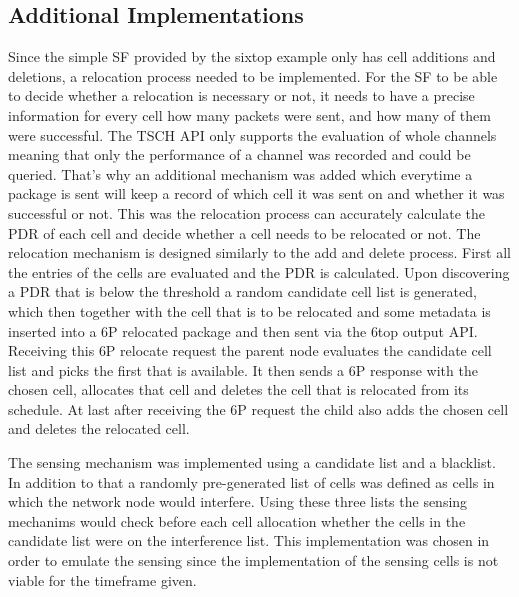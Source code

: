 \documentclass{comnets-thesis}
\begin{document}
\subsection*{Additional Implementations}
\label{sec:add-implementations}
Since the simple \ac{SF} provided by the sixtop example only has cell additions and deletions, a relocation process needed to be implemented. For the \ac{SF} to be able to decide whether a relocation is necessary or not, it needs to have a precise information for every cell how many packets were sent, and how many of them were successful. The \ac{TSCH} API only supports the evaluation of whole channels meaning that only the performance of a channel was recorded and could be queried. That's why an additional mechanism was added which everytime a package is sent will keep a record of which cell it was sent on and whether it was successful or not. This was the relocation process can accurately calculate the \ac{PDR} of each cell and decide whether a cell needs to be relocated or not.
The relocation mechanism is designed similarly to the add and delete process. First all the entries of the cells are evaluated and the \ac{PDR} is calculated. Upon discovering a \ac{PDR} that is below the threshold a random candidate cell list is generated, which then together with the cell that is to be relocated and some metadata is inserted into a \ac{6P} relocated package and then sent via the \ac{6top} output API.
Receiving this \ac{6P} relocate request the parent node evaluates the candidate cell list and picks the first that is available. It then sends a \ac{6P} response with the chosen cell, allocates that cell and deletes the cell that is relocated from its schedule.
At last after receiving the \ac{6P} request the child also adds the chosen cell and deletes the relocated cell.


The sensing mechanism was implemented using a candidate list and a blacklist. In addition to that a randomly pre-generated list of cells was defined as cells in which the network node would interfere. Using these three lists the sensing mechanims would check before each cell allocation whether the cells in the candidate list were on the interference list. This implementation was chosen in order to emulate the sensing since the implementation of the sensing cells is not viable for the timeframe given.
\end{document}
